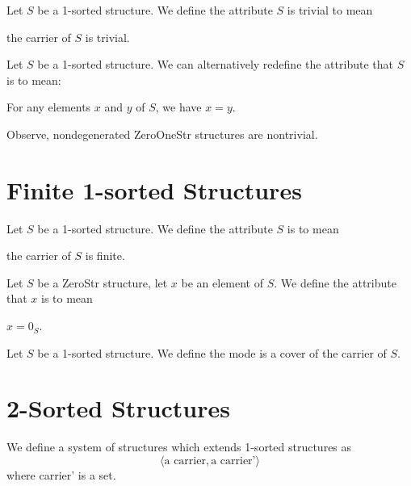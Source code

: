 \documentclass{article}
\begin{document}
\begin{definition}
Let $S$ be a 1-sorted structure.
We define the attribute $S$ is trivial to mean
\begin{defn}
\item the carrier of $S$ is trivial.
\end{defn}
\end{definition}

\begin{definition}
Let $S$ be a 1-sorted structure.
We can alternatively redefine the attribute that $S$ is 
to mean:
\begin{defn}
\item For any elements $x$ and $y$ of $S$, we have $x=y$.
\end{defn}
\end{definition}

Observe, nondegenerated ZeroOneStr structures are nontrivial.

\section{Finite 1-sorted Structures}

\begin{definition}
Let $S$ be a 1-sorted structure.
We define the attribute $S$ is  to mean
\begin{defn}
\item the carrier of $S$ is finite.
\end{defn}
\end{definition}

\begin{definition}
Let $S$ be a ZeroStr structure, let $x$ be an element of $S$.
We define the attribute that $x$ is  to mean
\begin{defn}
\item $x=0_{S}$.
\end{defn}
\end{definition}

\begin{definition}
Let $S$ be a 1-sorted structure.
We define the mode  is a cover of the carrier of $S$.
\end{definition}

\section{2-Sorted Structures}

\begin{definition}
We define a system of  structures which extends
1-sorted structures as
\[\langle\mbox{a carrier}, \mbox{a carrier'}\rangle\]
where carrier' is a set.
\end{definition}
\end{document}

